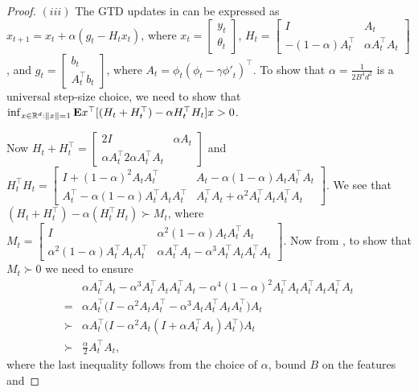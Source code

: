 \begin{proof}
\textbf{$(iii)$}
 The GTD updates in  can be expressed as $x_{t+1}=x_t+\alpha (g_t -H_t x_t)$, where $x_t=\left[\begin{matrix}y_t\\\theta_t\end{matrix}\right]$, $H_t=\left[\begin{matrix}I &A_t \\ -(1-\alpha)A^\top_t & \alpha A_t^\top A_t\end{matrix}\right]$, and $g_t=\left[\begin{matrix} b_t\\ A_t^\top b_t\end{matrix}\right]$, where $A_t=\phi_t(\phi_t-\gamma{\phi'}_t)^\top$. To show that $\alpha=\frac{1}{2B^4 d^2}$ is a universal step-size choice, we need to show that   $\inf_{x\in \mathbb{R}^d:\left\| x\right\|=1}\mathbf{E}{x^\top[(H_t+H_t^\top) -\alpha H_t^\top H_t]x}>0$.

Now $H_t+H_t^\top=\left[\begin{matrix} 2I & \alpha A_t\\ \alpha A_t^\top 2\alpha A_t^\top A_t\end{matrix}\right]$ and $H_t^\top H_t=\left[\begin{matrix} I+(1-\alpha)^2A_tA_t^\top & A_t-\alpha(1-\alpha)A_tA_t^\top A_t\\ A_t^\top-\alpha(1-\alpha)A_t^\top A_t A_t^\top & A_t^\top A_t+\alpha^2A_t^\top A_t A_t^\top A_t\end{matrix}\right]$.  We see that $(H_t+H_t^\top) -\alpha(H_t^\top H_t) \succ M_t$, where $M_t=\left[\begin{matrix}I &\alpha^2(1-\alpha) A_tA_t^\top A_t\\ \alpha^2(1-\alpha) A_t^\top A_t A_t^\top &\alpha A_t^\top A_t-\alpha^3A_t^\top A_tA_t^\top A_t\end{matrix}\right]$. Now from , to show that $M_t\succ 0$ we need to ensure 
\begin{align}
&\alpha A_t^\top A_t -\alpha^3A_t^\top A_t A_t^\top A_t - \alpha^4(1-\alpha)^2A_t^\top A_t A_t^\top A_t A_t^\top A_t\\
=&\alpha A_t^\top\big(I-\alpha^2 A_tA_t^\top-\alpha^3A_tA_t^\top A_tA_t^\top\big)A_t\\
\succ &\alpha A_t^\top\big(I-\alpha^2 A_t(I+\alpha A_t^\top A_t)A_t^\top\big)A_t\\
\succ& \frac{\alpha}{2} A_t^\top A_t,
\end{align}
where the last inequality follows from the choice of $\alpha$, bound $B$ on the features and 
\end{proof}
